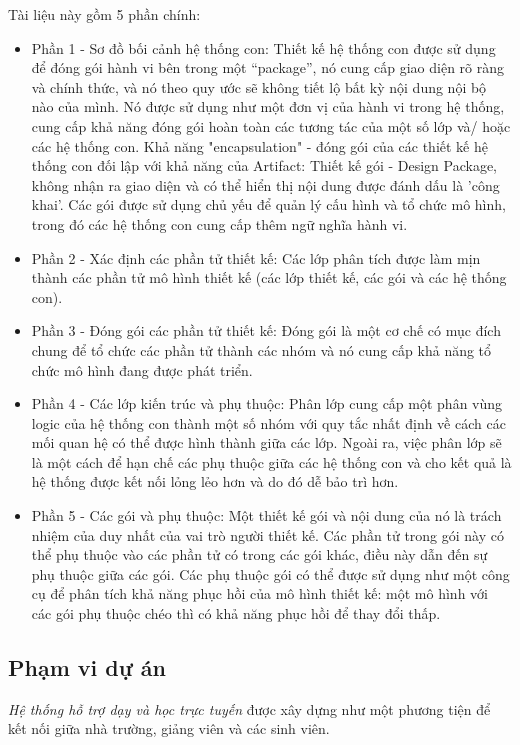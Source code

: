 \documentclass[./../main.tex]{subfiles}
\begin{document}
Tài liệu này gồm 5 phần chính:
\begin{itemize}
	\item Phần 1 - Sơ đồ bối cảnh hệ thống con: Thiết kế hệ thống con được sử dụng để đóng gói hành vi bên trong một “package”, nó cung cấp giao diện rõ ràng và chính thức, và nó theo quy ước sẽ không tiết lộ bất kỳ nội dung nội bộ nào của mình. Nó được sử dụng như một đơn vị của hành vi trong hệ thống, cung cấp khả năng đóng gói hoàn toàn các tương tác của một số lớp và/ hoặc các hệ thống con. Khả năng "encapsulation" - đóng gói của các thiết kế hệ thống con đối lập với khả năng của Artifact: Thiết kế gói - Design Package, không nhận ra giao diện và có thể hiển thị nội dung được đánh dấu là 'công khai'. Các gói được sử dụng chủ yếu để quản lý cấu hình và tổ chức mô hình, trong đó các hệ thống con cung cấp thêm ngữ nghĩa hành vi. 
	\item Phần 2 - Xác định các phần tử thiết kế: Các lớp phân tích được làm mịn thành các phần tử mô hình thiết kế (các lớp thiết kế, các gói và các hệ thống con).
	\item Phần 3 - Đóng gói các phần tử thiết kế: Đóng gói là một cơ chế có mục đích chung để tổ chức các phần tử thành các nhóm và nó cung cấp khả năng tổ chức mô hình đang được phát triển. 
	\item Phần 4 - Các lớp kiến trúc và phụ thuộc: Phân lớp cung cấp một phân vùng logic của hệ thống con thành một số nhóm với quy tắc nhất định về cách các mối quan hệ có thể được hình thành giữa các lớp. Ngoài ra, việc phân lớp sẽ là một cách để hạn chế các phụ thuộc giữa các hệ thống con và cho kết quả là hệ thống được kết nối lỏng lẻo hơn và do đó dễ bảo trì hơn.
	\item Phần 5 - Các gói và phụ thuộc: Một thiết kế gói và nội dung của nó là trách nhiệm của duy nhất của vai trò người thiết kế. Các phần tử trong gói này có thể phụ thuộc vào các phần tử có trong các gói khác, điều này dẫn đến sự phụ thuộc giữa các gói. Các phụ thuộc gói có thể được sử dụng như một công cụ để phân tích khả năng phục hồi của mô hình thiết kế: một mô hình với các gói phụ thuộc chéo thì có khả năng phục hồi để thay đổi thấp.
\end{itemize}

\subsection{Phạm vi dự án}

\textit{Hệ thống hỗ trợ dạy và học trực tuyến} được xây dựng như một phương tiện để kết nối giữa nhà trường, giảng viên và các sinh viên.
\end{document}
